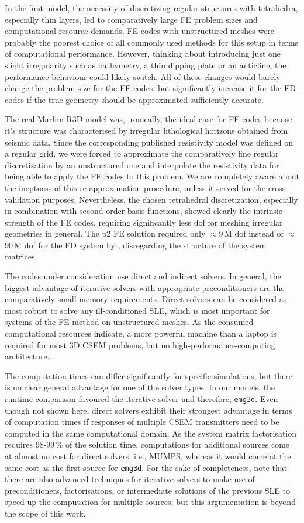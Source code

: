 \documentclass[
    paper,
  ]{geophysics}
\newcommand{\emg}[2]{\texttt{emg#1#2}\xspace}
\begin{document}
In the first model, the necessity of discretizing regular structures with tetrahedra, especially thin layers, led to comparatively large FE problem sizes and computational resource demands. FE codes with unstructured meshes were probably the poorest choice of all commonly used methods for this setup in terms of computational performance. However, thinking about introducing just one slight irregularity such as bathymetry, a thin dipping plate or an anticline, the performance behaviour could likely switch. All of these changes would barely change the problem size for the FE codes, but significantly increase it for the FD codes if the true geometry should be approximated sufficiently accurate.

The real Marlim R3D model was, ironically, the ideal case for FE codes because it's structure was characterised by irregular lithological horizons obtained from seismic data. Since the corresponding published resistivity model was defined on a regular grid, we were forced to approximate the comparatively fine regular discretization by an unstructured one and interpolate the resistivity data for being able to apply the FE codes to this problem. We are completely aware about the ineptness of this re-approximation procedure, unless it served for the cross-validation purposes. Nevertheless, the chosen tetrahedral discretization, especially in combination with second order basis functions, showed clearly the intrinsic strength of the FE codes, requiring significantly less dof for meshing irregular geometries in general. The p2 FE solution required only $\approx$9\,M dof instead of $\approx$90\,M dof for the FD system by \citet{GEO.19.Correa}, disregarding the structure of the system matrices.

The codes under consideration use direct and indirect solvers. In general, the biggest advantage of iterative solvers with appropriate preconditioners are the comparatively small memory requirements. Direct solvers can be considered as most robust to solve any ill-conditioned SLE, which is most important for systems of the FE method on unstructured meshes. As the consumed computational resources indicate, a more powerful machine than a laptop is required for most 3D CSEM problems, but no high-performance-computing architecture.

The computation times can differ significantly for specific simulations, but there is no clear general advantage for one of the solver types. In our models, the runtime comparison favoured the iterative solver and therefore, \emg3d. Even though not shown here, direct solvers exhibit their strongest advantage in terms of computation times if responses of multiple CSEM transmitters need to be computed in the same computational domain. As the system matrix factorisation requires 98-99\,\% of the solution time, computations for additional sources come at almost no cost for direct solvers, i.e., MUMPS, whereas it would come at the same cost as the first source for \emg3d. For the sake of completeness, note that there are also advanced techniques for iterative solvers to make use of preconditioners, factorisations, or intermediate solutions of the previous SLE to speed up the computation for multiple sources, but this argumentation is beyond the scope of this work.
\end{document}
